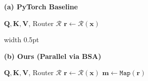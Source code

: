 \begin{algorithm}[t]
    \caption{Comparison of Serial Dispatch (Baseline) vs. Parallel BSA (Ours)}
    \label{alg:comparison}
    \centering
    \begin{minipage}[t]{0.48\textwidth}
        \centerline{\textbf{(a) PyTorch Baseline}} 
        \begin{algorithmic}[1]
            \REQUIRE $\mathbf{Q}, \mathbf{K}, \mathbf{V}$, Router $\mathcal{R}$
            \STATE $\mathbf{r} \leftarrow \mathcal{R}(\mathbf{x})$
            \STATE {}
        \end{algorithmic}
    \end{minipage}%
    \hfill \vrule width 0.5pt \hfill
    \begin{minipage}[t]{0.48\textwidth}
        \centerline{\textbf{(b) Ours (Parallel via BSA)}}
        
        \begin{algorithmic}[1]
            \REQUIRE $\mathbf{Q}, \mathbf{K}, \mathbf{V}$, Router $\mathcal{R}$
            \STATE $\mathbf{r} \leftarrow \mathcal{R}(\mathbf{x})$
            \STATE $\mathbf{m} \leftarrow \texttt{Map}(\mathbf{r})$

            \STATE {}
\end{algorithmic}
\end{minipage}
\end{algorithm}
